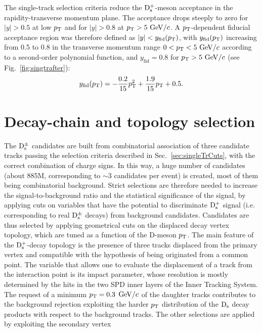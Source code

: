 The single-track selection criteria reduce the ${\rm D_s^+}$-meson acceptance
in the rapidity-transverse momentum plane. The acceptance drops 
steeply to zero for $|y| > 0.5$ at low $p_{\rm T}$ and for $|y| > 0.8$ 
at $p_{\rm T} > 5~\mathrm{GeV}/c$. A $p_{\rm T}$-dependent fiducial acceptance region was therefore defined as 
$|y| < y_{\mathrm{fid}}(p_{\rm T})$, with $y_{\mathrm{fid}}(p_{\rm T})$ increasing 
from 0.5 to 0.8 in the transverse momentum range $0 < p_{\rm T} < 5~\mathrm{GeV}/c$ 
according to a second-order polynomial function, and $y_{\mathrm{fid}}=0.8$ 
for $p_{\rm T} > 5~\mathrm{GeV}/c$ (see Fig.~\ref{fig:singtrafter}):
\begin{equation}
\label{eq:yFid}
y_{\rm fid} (p_{\rm T}) = -\frac{0.2}{15}p_{\rm T}^2 + \frac{1.9}{15}p_{\rm T} + 0.5.
\end{equation}

\section{Decay-chain and topology selection}
\label{sec:topolPP}
The ${\rm D_s^{\pm}}$ candidates are built from combinatorial 
 association of three candidate tracks passing the selection criteria 
 described in Sec.~\ref{sec:singleTrCuts}, with the correct combination of charge 
 signs. In this way, a huge number of candidates (about 885M, corresponding to $\sim$3 candidates per event) 
 is created, most of them being combinatorial background. 
 Strict selections are therefore needed to increase
 the signal-to-background ratio and the statistical significance of the signal,
 by applying cuts on variables that have the potential to discriminate
 ${\rm D_s^+}$ signal (i.e. corresponding to real ${\rm D_s^{\pm}}$ decays) 
 from background candidates. Candidates 
  are thus selected by applying geometrical cuts on the displaced decay vertex 
  topology, which are tuned as a function of the D-meson $p_{\rm T}$.
The main feature of the ${\rm D_s^+}$-decay topology is the presence of three tracks displaced from 
the primary vertex and compatible with the hypothesis of being originated from 
a common point. 
The variable that allows one to evaluate the displacement of a track from the interaction point is its 
impact parameter, whose resolution is mostly determined by the hits in the 
two SPD inner layers of the Inner Tracking System. \\
The request of a minimum $p_{\rm T} = 0.3$ $\mathrm{GeV}/c$ of the daughter tracks contributes to 
the background rejection exploiting the harder  $p_{\rm T}$ distribution of
the ${\rm D_s}$ decay products with respect to the background tracks. 
The other selections are applied by exploiting the secondary vertex
